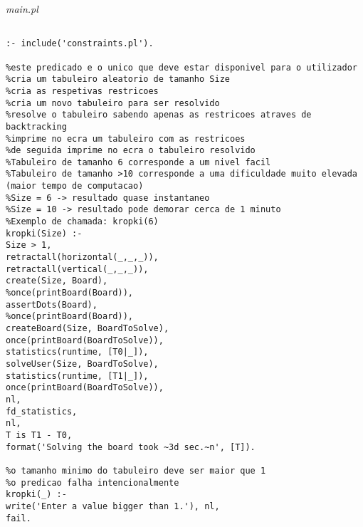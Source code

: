 \documentclass[runningheads,a4paper]{llncs}
\begin{document}
	\noindent
	{\it main.pl}
	\begin{changemargin}{-3cm}{-4cm}
		\begin{verbatim}
		
:- include('constraints.pl').

%este predicado e o unico que deve estar disponivel para o utilizador
%cria um tabuleiro aleatorio de tamanho Size
%cria as respetivas restricoes
%cria um novo tabuleiro para ser resolvido
%resolve o tabuleiro sabendo apenas as restricoes atraves de backtracking
%imprime no ecra um tabuleiro com as restricoes
%de seguida imprime no ecra o tabuleiro resolvido
%Tabuleiro de tamanho 6 corresponde a um nivel facil
%Tabuleiro de tamanho >10 corresponde a uma dificuldade muito elevada (maior tempo de computacao)
%Size = 6 -> resultado quase instantaneo
%Size = 10 -> resultado pode demorar cerca de 1 minuto
%Exemplo de chamada: kropki(6)
kropki(Size) :-
Size > 1,
retractall(horizontal(_,_,_)),
retractall(vertical(_,_,_)),
create(Size, Board),
%once(printBoard(Board)),
assertDots(Board),
%once(printBoard(Board)),
createBoard(Size, BoardToSolve),
once(printBoard(BoardToSolve)),
statistics(runtime, [T0|_]),
solveUser(Size, BoardToSolve),
statistics(runtime, [T1|_]),
once(printBoard(BoardToSolve)),
nl,
fd_statistics,
nl,
T is T1 - T0,
format('Solving the board took ~3d sec.~n', [T]).

%o tamanho minimo do tabuleiro deve ser maior que 1
%o predicao falha intencionalmente
kropki(_) :-
write('Enter a value bigger than 1.'), nl,
fail.

		
		\end{verbatim}
	\end{changemargin}
\end{document}
